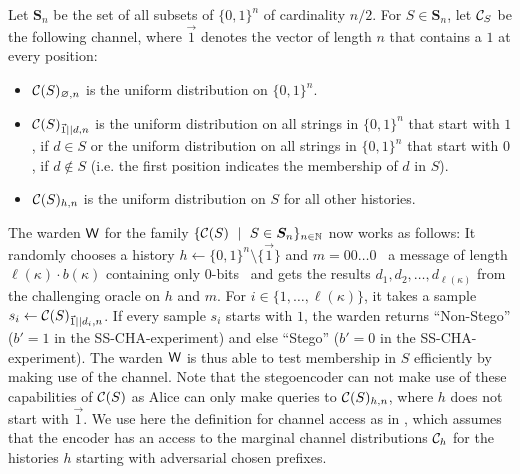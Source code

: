 Let $\bm{S}_n$ be the set of all subsets of $\{0,1\}^{n}$ of
cardinality $n/2$. For $S\in \bm{S}_n$, let $\mathcal{C}_{S}$ be the following
channel, where $\vec{1}$ denotes the vector of length $n$ that contains
a $1$ at every position:
\begin{itemize}
\item $\mathcal{C}(S)_{\varnothing,n}$ is the uniform distribution on
  $\{0,1\}^{n}$.
\item $\mathcal{C}(S)_{\vec{1}||d,n}$ is the uniform distribution on all
  strings in $\{0,1\}^{n}$ that start with $1$, if $d\in S$ or the
  uniform distribution on all strings in $\{0,1\}^{n}$ that start with
  $0$, if $d\not\in S$ (i.e. the first position indicates the membership
  of $d$ in $S$).
\item $\mathcal{C}(S)_{h,n}$ is the uniform distribution on $S$ for all other
  histories.
\end{itemize}
The warden $\operatorname{\mathsf{W}}$ for the family $\{\mathcal{C}(S)\ \mid\ S\in \bm{S}_n\}_{n\in \mathbb{N}}$ now
works as follows: It randomly chooses a history
$h\gets \{0,1\}^{n}\setminus \{\vec{1}\}$ and $m=00\ldots 0$ 
\textendash\  a message of length $\ell(\kappa)\cdot b(\kappa)$ containing only $0$-bits \textendash\ 
and gets
the results $d_{1},d_{2},\ldots,d_{\ell(\kappa)}$ from the challenging oracle on
$h$ and $m$. For $i\in \{1,\ldots,\ell(\kappa)\}$, it takes a sample
$s_{i}\gets \mathcal{C}(S)_{\vec{1}||d_{i},n}$. If every sample $s_{i}$ starts
with $1$, the warden returns ``Non-Stego'' (\ie $b'=1$ in the
\ac{SS-CHA}-experiment) and else ``Stego'' (\ie $b'=0$ in the \ac{SS-CHA}-experiment). The
warden $\operatorname{\mathsf{W}}$ is thus able to test membership in $S$ efficiently by making
use of the channel. Note that the stegoencoder can not make use of these
capabilities of $\mathcal{C}(S)$ as Alice can only make queries to $\mathcal{C}(S)_{h,n}$, 
where $h$ does not start with $\vec{1}$. We use here the 
definition for channel access as in \cite{hopper2009provably}, which 
assumes that the encoder has an access to the marginal channel distributions $\mathcal{C}_h$
for the histories $h$ starting with adversarial chosen prefixes. 



